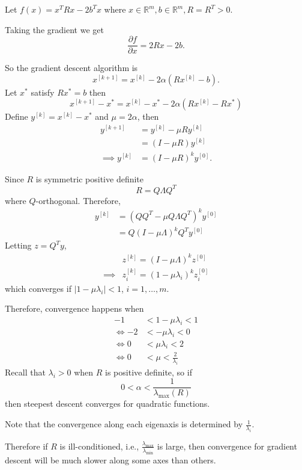 \documentclass{article}
\newcommand{\abs}[1]{\left|{#1}\right|}
\begin{document}
	
	Let $f(x) = x^TRx - 2b^Tx$ where $x \in \mathbb{R}^m,b\in\mathbb{R}^m,R=R^T>0$.	
	
	
	Taking the gradient we get
	\[ 
		\frac{\partial f}{\partial x} = 2Rx - 2b.
	\]

	So the gradient descent algorithm is
	\[ 
		x^{[k+1]} = x^{[k]} - 2\alpha(Rx^{[k]} - b). 
	\]
	Let $x^{\ast}$ satisfy $Rx^{\ast}=b$ then
	\[ 
		x^{[k+1]} - x^{\ast} = x^{[k]} - x^{\ast} - 2\alpha(Rx^{[k]} - Rx^{\ast}) 
	\]
	Define $y^{[k]} = x^{[k]} - x^{\ast}$ and $\mu = 2\alpha$, then 
	\begin{align*}
		y^{[k+1]} 
			&= y^{[k]} - \mu R y^{[k]} \\
			&= (I - \mu R)y^{[k]}\\
		\implies y^{[k]} &= (I - \mu R)^ky^{[0]}.
	\end{align*}	

	Since $R$ is symmetric positive definite
	\[ 
		R = Q\Lambda Q^T 
	\]
	where $Q$-orthogonal.
	Therefore,
	\begin{align*}
		y^{[k]} 
			&= (QQ^T-\mu Q\Lambda Q^T)^ky^{[0]}\\
			&= Q(I-\mu\Lambda)^kQ^Ty^{[0]}
	\end{align*}
	Letting $z = Q^Ty$,
	\begin{align}
		& z^{[k]} = (I - \mu\Lambda)^kz^{[0]}\\
		\implies &
		z^{[k]}_i = (1 - \mu \lambda_i)^kz_i^{[0]}
	\end{align}
	which converges if $\abs{1-\mu\lambda_i} < 1$, $i = 1, \ldots, m$.	

	Therefore, convergence happens when
	\begin{align*}
	-1 &< 1 - \mu \lambda_i < 1 \\
	\iff -2 &< -\mu\lambda_i < 0\\
	\iff 0 &< \mu\lambda_i < 2\\
	\iff 0 &< \mu < \frac{2}{\lambda_i} 
	\end{align*}
	Recall that $\lambda_i > 0$ when $R$ is positive definite, 
	so if
	\[ 
		0 < \alpha < \frac{1}{\lambda_{\max}(R)} 
	\]
	then steepest descent converges for quadratic functions.

	Note that the convergence along each eigenaxis is determined by 
	\(
		\frac{1}{\lambda_i}.
	\)	
	
	Therefore if $R$ is ill-conditioned, i.e., $\displaystyle \frac{\lambda_{\max}}{\lambda_{\min}}$ is large, then convergence for gradient descent will be much slower along some axes than others.	
\end{document}
